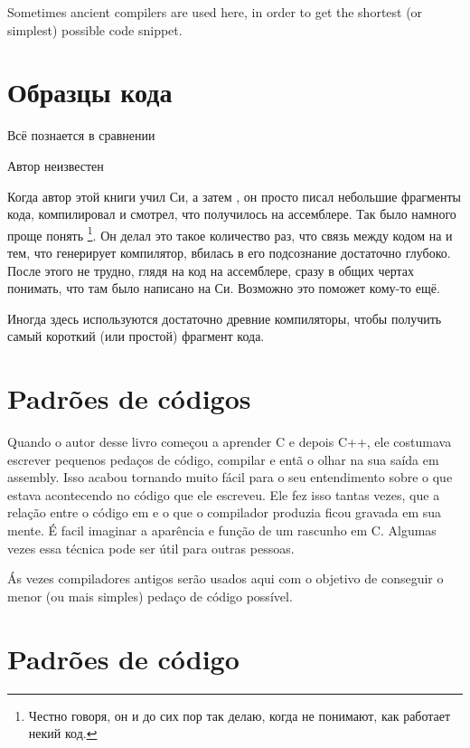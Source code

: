 
Sometimes ancient compilers are used here, in order to get the shortest (or simplest) possible code snippet.
\fi %

\ifdefined\RUSSIAN
\part{Образцы кода}
\epigraph{Всё познается в сравнении}{Автор неизвестен}

Когда автор этой книги учил Си, а затем \Cpp, он просто писал небольшие фрагменты кода, компилировал и смотрел, что 
получилось на ассемблере. Так было намного проще понять%
\footnote{Честно говоря, он и до сих пор так делаю, когда не понимают, как работает некий код.}.
Он делал это такое количество раз, что связь между кодом на \CCpp и тем, что генерирует компилятор, вбилась в его подсознание достаточно глубоко.
После этого не трудно, глядя на код на ассемблере, сразу в общих чертах понимать, что там было написано на Си. 
Возможно это поможет кому-то ещё.


Иногда здесь используются достаточно древние компиляторы, чтобы получить самый короткий (или простой) фрагмент кода.
\fi %

\ifdefined\BRAZILIAN
\part{Padrões de códigos}

Quando o autor desse livro começou a aprender C e depois C++, ele costumava escrever pequenos pedaços de código, compilar e entã o olhar na sua saída em assembly.
Isso acabou tornando muito fácil para o seu entendimento sobre o que estava acontecendo no código que ele escreveu.
Ele fez isso tantas vezes, que a relação entre o código em \CCpp e o que o compilador produzia ficou gravada em sua mente.
É facil imaginar a aparência e função de um rascunho em C. Algumas vezes essa técnica pode ser útil para outras pessoas.

Ás vezes compiladores antigos serão usados aqui com o objetivo de conseguir o menor (ou mais simples) pedaço de código possível.

\iffalse
\part{Padrões de código}


